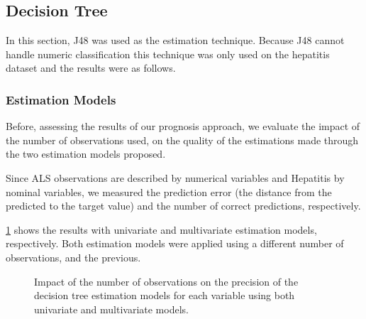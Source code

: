 \subsection{Decision Tree}
\label{subsection:dt}

In this section, J48 was used as the estimation technique. Because J48 cannot handle numeric classification
 this technique was only used on the hepatitis dataset and the results were as follows.

\subsubsection{Estimation Models}
\label{subsubsection:estimation_dt}

Before, assessing the results of our prognosis approach, we evaluate the impact of the number of observations used, on the 
quality of the estimations made through the two estimation models proposed.

Since ALS observations are described by numerical variables and Hepatitis by nominal variables, we measured the prediction
 error (the distance from the predicted to the target value) and the number of correct predictions, respectively.

\ref{fig:estimationtreeh} shows the results with univariate and multivariate estimation models,
 respectively. Both estimation models were applied using a different number of observations, and the previous. 
 
\begin{figure}
  \begin{subfigmatrix}{2}
  \end{subfigmatrix}
  \caption{Impact of the number of observations on the precision of the decision tree estimation models for each variable using both univariate and multivariate models.}
  \label{fig:estimationtreeh}
\end{figure}
 
